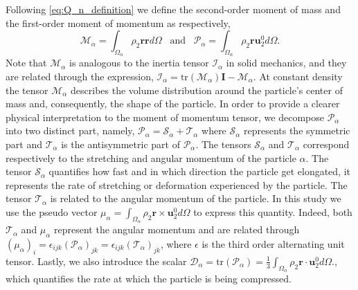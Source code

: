 Following \ref{eq:Q_n_definition} we define the second-order moment of mass and the first-order moment of momentum as respectively,
\begin{equation}
    \mathcal{M}_\alpha 
    = \int_{\Omega_\alpha} \rho_2 \textbf{r} \textbf{r} d\Omega
    \;\;\;\text{and}\;\;\;
    \mathcal{P}_\alpha 
    = \int_{\Omega_\alpha} \rho_2 \textbf{r} \textbf{u}_2^0 d\Omega.
    \label{eq:first_moment_of_momentum_def}
\end{equation}
Note that $\mathcal{M}_\alpha$ is analogous to the inertia tensor $\mathcal{I}_\alpha$ in solid mechanics, and they are related through the expression, $\mathcal{I}_\alpha = \text{tr}(\mathcal{M}_\alpha)\textbf{I} - \mathcal{M}_\alpha$.
At constant density the tensor $\mathcal{M}_\alpha$ describes the volume distribution around the particle's center of mass and, consequently, the shape of the particle.
In order to provide a clearer physical interpretation to the moment of momentum tensor, we decompose $\mathcal{P}_\alpha$ into two distinct part, namely,
$\mathcal{P}_\alpha = \mathcal{S}_\alpha+\mathcal{T}_\alpha$ where $\mathcal{S}_\alpha$ represents the symmetric part and $\mathcal{T}_\alpha$ is the antisymmetric part of $\mathcal{P}_\alpha$.
The tensors $\mathcal{S}_\alpha$ and $\mathcal{T}_\alpha$ correspond respectively to the stretching and angular momentum of the particle $\alpha$. 
The tensor $\mathcal{S}_\alpha$ quantifies how fast and in which direction the particle get elongated, it represents the rate of stretching or deformation experienced by the particle.
The tensor $\mathcal{T}_\alpha$ is related to the angular momentum of the particle. 
In this study we use the pseudo vector $\mu_\alpha = \int_{\Omega_\alpha} \rho_2 \textbf{r} \times \textbf{u}_2^0 d\Omega$ to express this quantity. 
Indeed, both  $\mathcal{T}_\alpha$ and $\mu_\alpha$ represent the angular momentum and are related through $(\mu_\alpha)_i = \epsilon_{ijk} (\mathcal{P}_\alpha)_{jk}= \epsilon_{ijk} (\mathcal{T}_\alpha)_{jk}$, where $\epsilon$ is the third order alternating unit tensor. 
Lastly, we also introduce the scalar $\mathcal{D}_\alpha = \text{tr}(\mathcal{P}_\alpha) = \frac{1}{3}\int_{\Omega_\alpha} \rho_2 \textbf{r} \cdot \textbf{u}_2^0 d\Omega.$, which quantifies the rate at which the particle is being compressed.


